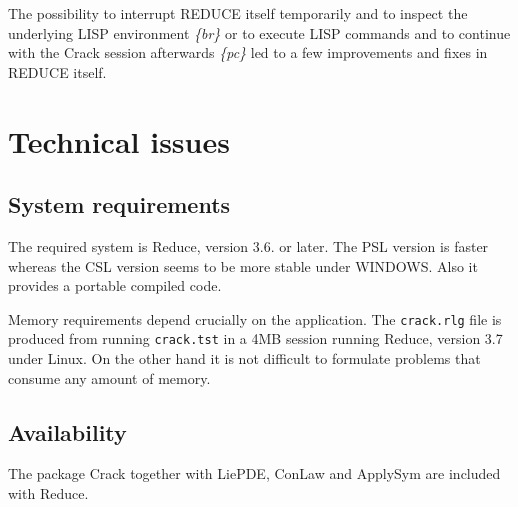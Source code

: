 \documentclass[12pt]{article}
\begin{document}
  The possibility to interrupt REDUCE itself temporarily and to
  inspect the underlying LISP environment {\em \{br\} }
  or to execute LISP commands and to continue with the {\sc Crack}
  session afterwards {\em \{pc\} }
  led to a few improvements and fixes in REDUCE itself.

\section{Technical issues}
\subsection{System requirements}
The required system is {\sc Reduce}, version
3.6. or later. The PSL version is faster whereas
the CSL version seems to be more stable under WINDOWS. Also it
provides a portable compiled code.

Memory requirements depend crucially on the
application. The {\tt crack.rlg} file is produced from running
{\tt crack.tst} in a 4MB session running {\sc Reduce}, version 3.7 under
{\sc Linux}. On the other hand it is not difficult to formulate problems that
consume any amount of memory.


\subsection{Availability}
The package {\sc Crack} together with {\sc LiePDE, ConLaw} and {\sc ApplySym}
are included with {\sc Reduce}.
\end{document}

